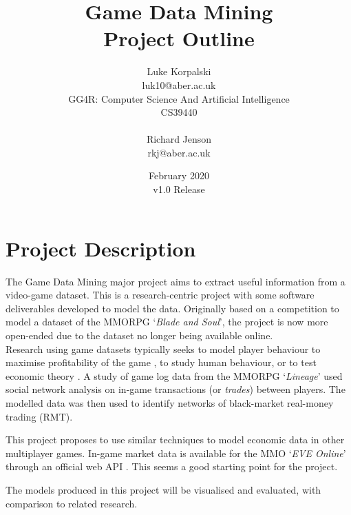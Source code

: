 \documentclass[]{article}
\title{Game Data Mining\\Project Outline}
\author{Luke Korpalski\\luk10@aber.ac.uk\\
	    GG4R: Computer Science And Artificial Intelligence\\
		CS39440\\
	  \\Richard Jenson\\rkj@aber.ac.uk\\}
\date{February 2020\\
      v1.0 Release}
\begin{document}
\maketitle

\newpage
\section{Project Description}
The Game Data Mining major project aims to extract useful information from a video-game dataset.
This is a research-centric project with some software deliverables developed to model the data.
Originally based on a competition to model a dataset of the MMORPG `\textit{Blade and Soul}', the project is now more open-ended due to the dataset no longer being available online.
\\

Research using game datasets typically seeks to model player behaviour to maximise profitability of the game \cite{kaw09}, to study human behaviour, or to test economic theory \cite{shen12}.
A study \cite{lee18} of game log data from the MMORPG `\textit{Lineage}' used social network analysis on in-game transactions (or \textit{trades}) between players.
The modelled data was then used to identify networks of black-market real-money trading (RMT).

This project proposes to use similar techniques to model economic data in other multiplayer games.
In-game market data is available for the MMO `\textit{EVE Online}' through an official web API \cite{ccp}.
This seems a good starting point for the project.

The models produced in this project will be visualised and evaluated, with comparison to related research.


\vspace{1cm}
\end{document}
